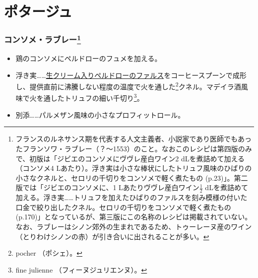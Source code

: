 \newpage

\hypertarget{Potages}{%
\section{ポタージュ}\label{Potages}}
\begin{recette}
\hypertarget{consomme-rabelais}{%
\subsubsection[コンソメ・ラブレー]{\texorpdfstring{コンソメ・ラブレー\footnote{フランスのルネサンス期を代表する人文主義者、小説家であり医師でもあったフランソワ・ラブレー（？〜1553）のこと。なおこのレシピは第四版のみで、初版は「ジビエのコンソメにヴヴレ産白ワイン2
  dLを煮詰めて加える（コンソメ4
  Lあたり）。浮き実は小さな棒状にしたトリュフ風味のひばりの小さなクネルと、セロリの千切りをコンソメで軽く煮たもの
  (p.23)」。第二版では「ジビエのコンソメに、1
  Lあたりヴヴレ産白ワイン\(\frac{1}{2}\)
  dLを煮詰めて加える。浮き実\ldots{}\ldots{}トリュフを加えたひばりのファルスを刻み模様の付いた口金で絞り出したクネル。セロリの千切りをコンソメで軽く煮たもの(p.170)」となっているが、第三版にこの名称のレシピは掲載されていない。なお、ラブレーはシノン郊外の生まれであるため、トゥーレーヌ産のワイン（とりわけシノンの赤）が引き合いに出されることが多い。}}{コンソメ・ラブレー}}\label{consomme-rabelais}}

\begin{itemize}
\item
  鶏のコンソメにペルドローのフュメを加える。
\item
  浮き実\ldots{}\ldots{}\protect\hyperlink{farce-c}{生クリーム入りペルドローのファルス}をコーヒースプーンで成形し、提供直前に沸騰しない程度の温度で火を通した\footnote{pocher
    （ポシェ）。}クネル。マデイラ酒風味で火を通したトリュフの細い千切り\footnote{fine
    julienne （フィーヌジュリエンヌ）。}。
\item
  別添\ldots{}\ldots{}パルメザン風味の小さなプロフィットロール。
\end{itemize}

\hypertarget{puree-conde}{%
}
\end{recette}
